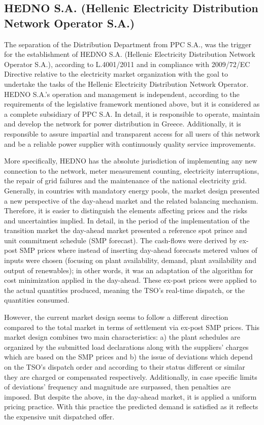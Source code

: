 \subsection{HEDNO S.A. (Hellenic Electricity Distribution
Network Operator S.A.)}
\par The separation of the Distribution Department from PPC S.A., was the trigger for the establishment of HEDNO S.A. (Hellenic Electricity Distribution Network Operator S.A.), according to L.4001/2011 and in compliance with 2009/72/EC Directive relative to the electricity market organization with the goal to undertake the tasks of the Hellenic Electricity Distribution Network Operator. HEDNO S.A.’s operation and management is independent, according to the requirements of the legislative framework mentioned above, but it is considered as a complete subsidiary of PPC S.A. In detail, it is responsible to operate, maintain and develop the network for power distribution in Greece. Additionally, it is responsible to assure impartial and transparent access for all users of this network and be a reliable power supplier with continuously quality service improvements.
\par More specifically, HEDNO has the absolute jurisdiction of implementing any new connection to the network, meter measurement counting, electricity interruptions, the repair of grid failures and the maintenance of the national electricity grid. Generally, in countries with mandatory energy pools, the market design presented a new perspective of the day-ahead market and the related balancing mechanism. Therefore, it is easier to distinguish the elements affecting prices and the risks and uncertainties implied. In detail, in the period of the implementation of the transition market the day-ahead market presented a reference spot prince and unit commitment schedule (SMP forecast). The cash-flows were derived by ex-post SMP prices where instead of inserting day-ahead forecasts metered values of inputs were chosen (focusing on plant availability, demand, plant availability and output of renewables); in other words, it was an adaptation of the algorithm for cost minimization applied in the day-ahead. These ex-post prices were applied to the actual quantities produced, meaning the TSO’s real-time dispatch, or the quantities consumed.
\par However, the current market design seems to follow a different direction compared to the total market in terms of settlement via ex-post SMP prices. This market design combines two main characteristics: a) the plant schedules are organized by the submitted load declarations along with the suppliers’ charges which are based on the SMP prices and b) the issue of deviations which depend on the TSO’s dispatch order and according to their status different or similar they are charged or compensated respectively. Additionally, in case specific limits of deviations’ frequency and magnitude are surpassed, then penalties are imposed. But despite the above, in the day-ahead market, it is applied a uniform pricing practice.  With this practice the predicted demand is satisfied as it reflects the expensive unit dispatched offer.
